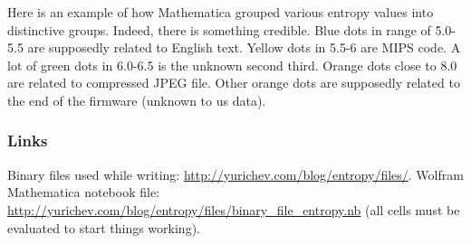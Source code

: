 \begin{figure}[H]
\centering
{}
\end{figure}

Here is an example of how Mathematica grouped various entropy values into distinctive groups.
Indeed, there is something credible. Blue dots in range of 5.0-5.5 are supposedly related to English text.
Yellow dots in 5.5-6 are MIPS code. A lot of green dots in 6.0-6.5 is the unknown second third.
Orange dots close to 8.0 are related to compressed JPEG file.
Other orange dots are supposedly related to the end of the firmware (unknown to us data).

\subsubsection{Links}

Binary files used while writing: \url{http://yurichev.com/blog/entropy/files/}.
Wolfram Mathematica notebook file: \url{http://yurichev.com/blog/entropy/files/binary_file_entropy.nb}
(all cells must be evaluated to start things working).

